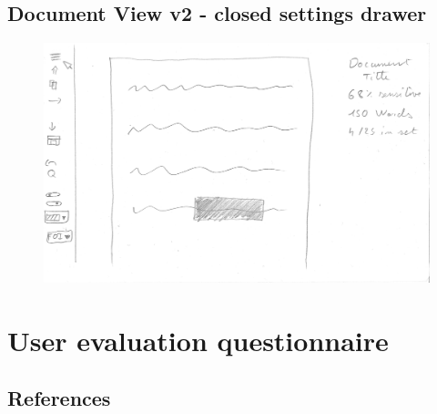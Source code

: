 \documentclass[\version]{l4proj}
\begin{document}
\begin{appendices}
    \section{Document View v2 - closed settings drawer}\label{fig:document view-closed-menu-wireframe}
    \begin{figure}[H]
        \centering
        \includegraphics[width=\linewidth]{images/wireframes/doc-view.jpg}
    \end{figure}
    \chapter{User evaluation questionnaire}\label{appendix:questionnaire}
    
\end{appendices}


\newpage

\section*{References}

\printbibliography[heading=none]

\vspace*{\fill}

\doclicenseThis
\end{document}
